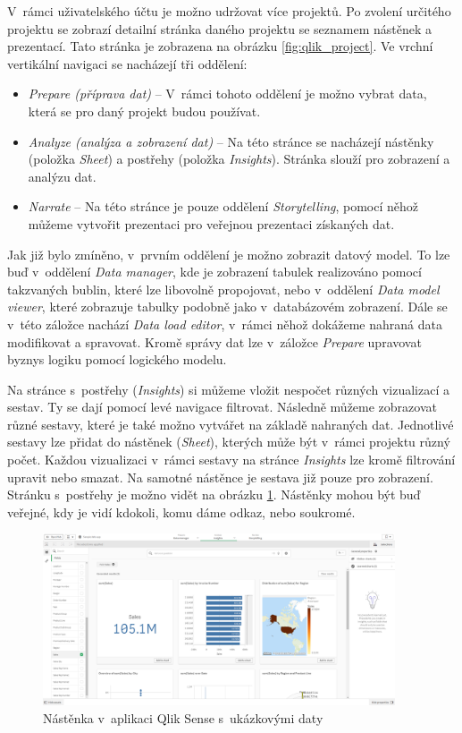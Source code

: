 \documentclass[czech,master]{diploma}
\begin{document}
V~rámci uživatelského účtu je možno udržovat více projektů. Po zvolení určitého projektu se zobrazí detailní stránka daného projektu se seznamem nástěnek a prezentací. Tato stránka je zobrazena na obrázku \ref{fig:qlik_project}.  Ve vrchní vertikální navigaci se nacházejí tři oddělení:

\begin{itemize}
\item \textit{Prepare (příprava dat)} -- V~rámci tohoto oddělení je možno vybrat data, která se pro daný projekt budou používat.
\item \textit{Analyze (analýza a zobrazení dat)} -- Na této stránce se nacházejí nástěnky (položka \textit{Sheet}) a postřehy (položka \textit{Insights}). Stránka slouží pro zobrazení a analýzu dat.
\item \textit{Narrate} -- Na této stránce je pouze oddělení \textit{Storytelling}, pomocí něhož můžeme vytvořit prezentaci pro veřejnou prezentaci získaných dat.
\end{itemize}


Jak již bylo zmíněno, v~prvním oddělení je možno zobrazit datový model. To lze buď v~oddělení \textit{Data manager}, kde je zobrazení tabulek realizováno pomocí takzvaných bublin, které lze libovolně propojovat, nebo v~oddělení \textit{Data model viewer}, které zobrazuje tabulky podobně jako v~databázovém zobrazení. Dále se v~této záložce nachází \textit{Data load editor}, v~rámci něhož dokážeme nahraná data modifikovat a spravovat. Kromě správy dat lze v~záložce \textit{Prepare} upravovat byznys logiku pomocí logického modelu.

Na stránce s~postřehy (\textit{Insights})  si můžeme vložit nespočet různých vizualizací a sestav. Ty se dají pomocí levé navigace filtrovat. Následně můžeme zobrazovat různé sestavy, které je také možno vytvářet na základě nahraných dat. Jednotlivé sestavy lze přidat do nástěnek (\textit{Sheet}), kterých může být v~rámci projektu různý počet. Každou vizualizaci v~rámci sestavy na stránce \textit{Insights} lze kromě filtrování upravit nebo smazat. Na samotné nástěnce je sestava již pouze pro zobrazení. Stránku s~postřehy je možno vidět na obrázku \ref{fig:qlik_dashboard}. Nástěnky mohou být buď veřejné, kdy je vidí kdokoli, komu dáme odkaz, nebo soukromé.

\begin{figure}[!ht]
    \centering
    \includegraphics[width=0.93\textwidth]{Diplomka/Figures/qlik_dashboard.png}
    \caption{Nástěnka v~aplikaci Qlik Sense s~ukázkovými daty}
    \label{fig:qlik_dashboard}
\end{figure}
\end{document}
